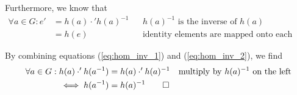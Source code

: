         Furthermore, we know that
        \begin{align}
            \forall a \in G: e' &= h(a) \cdot' h(a)^{-1}    && \text{$h(a)^{-1}$ is the inverse of $h(a)$} \label{eq:hom_inv_2} \\
            &= h(e)                                         && \text{identity elements are mapped onto each other}
        \end{align}

        By combining equations (\ref{eq:hom_inv_1}) and (\ref{eq:hom_inv_2}), we find
        \begin{align}
            \forall a \in G: h(a) \cdot' h(a^{-1}) &= h(a) \cdot' h(a)^{-1}     && \text{multiply by $h(a)^{-1}$ on the left} \\
            \iff h(a^{-1}) &= h(a)^{-1} \qed
        \end{align}
